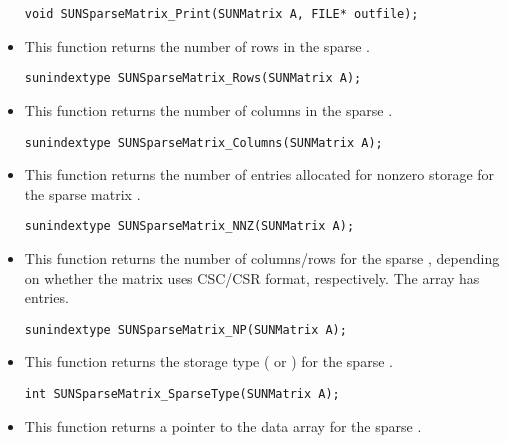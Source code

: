 \begin{itemize}
  \verb|void SUNSparseMatrix_Print(SUNMatrix A, FILE* outfile);|


\item {}

  This function returns the number of rows in the sparse .
 
  \verb|sunindextype SUNSparseMatrix_Rows(SUNMatrix A);|


\item {}

  This function returns the number of columns in the sparse .
 
  \verb|sunindextype SUNSparseMatrix_Columns(SUNMatrix A);|


\item {}

  This function returns the number of entries allocated for nonzero
  storage for  the sparse matrix .
 
  \verb|sunindextype SUNSparseMatrix_NNZ(SUNMatrix A);|


\item {}

  This function returns the number of columns/rows for the
  sparse , depending on whether the matrix uses CSC/CSR
  format, respectively.  The  array has  entries.
 
  \verb|sunindextype SUNSparseMatrix_NP(SUNMatrix A);|


\item {}

  This function returns the storage type (
  or ) for the sparse .
 
  \verb|int SUNSparseMatrix_SparseType(SUNMatrix A);|


\item {}

  This function returns a pointer to the data array for the
  sparse . 
 

\end{itemize}
